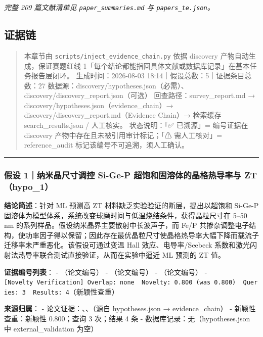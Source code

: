 \documentclass[12pt,a4paper]{ctexart}
\begin{document}
\emph{完整 209 篇文献清单见 \texttt{paper\_summaries.md} 与 \texttt{papers\_te.json}。}

\subsection{证据链}\label{ux8bc1ux636eux94fe}

\begin{quote}
本章节由 \texttt{scripts/inject\_evidence\_chain.py} 依据 discovery 产物自动生成，保证赛题红线 1「每个结论都能指回具体文献或数据库记录」在基本任务报告层闭环。 生成时间：2026-08-03 18:14｜假设总数：5｜证据条目总数：27 数据源：discovery/hypotheses.json（必需）、discovery/discovery\_report.json（可选） 回查路径：survey\_report.md → discovery/hypotheses.json（evidence\_chain）→ discovery/discovery\_report.md（Evidence Chain）→ 检索缓存 search\_results.json / 人工核实。 状态说明：「✅ 已溯源」= 编号证据在 discovery 产物中存在且未被引用审计标记；「⚠ 需人工核对」= reference\_audit 标记该编号不可追溯，须人工确认。
\end{quote}

\begin{center}\rule{0.5\linewidth}{0.5pt}\end{center}

\subsubsection{假设 1｜纳米晶尺寸调控 Si-Ge-P 超饱和固溶体的晶格热导率与 ZT（hypo\_1）}\label{ux5047ux8bbe-1ux7eb3ux7c73ux6676ux5c3aux5bf8ux8c03ux63a7-si-ge-p-ux8d85ux9971ux548cux56faux6eb6ux4f53ux7684ux6676ux683cux70edux5bfcux7387ux4e0e-zthypo_1}

\textbf{结论简述}：针对 ML 预测高 ZT 材料缺乏实验验证的断层，提出以超饱和 Si-Ge-P 固溶体为模型体系，系统改变球磨时间与低温烧结条件，获得晶粒尺寸在 5--50 nm 的系列样品。假设纳米晶界主要散射中长波声子，而 Fe/P 共掺杂调整电子结构，使功率因子得以保留；因此存在最优晶粒尺寸使晶格热导率大幅下降而载流子迁移率未严重恶化。该假设可通过变温 Hall 效应、电导率/Seebeck 系数和激光闪射法热导率联合测试直接验证，从而在实验中逼近 ML 预测的 ZT 值。

\textbf{证据编号列表}： - \texttt{\cite{TE002}}（论文编号） - \texttt{\cite{TE057}}（论文编号） - \texttt{\cite{TE009}}（论文编号） - \texttt{{[}Novelty\ Verification{]}\ Overlap:\ none\ \textbar{}\ Novelty:\ 0.800\ (was\ 0.800)\ \textbar{}\ Queries:\ 3\ \textbar{}\ Results:\ 4}（新颖性查重）

\textbf{来源归属}： - 论文证据：\texttt{\cite{TE002}}、\texttt{\cite{TE057}}、\texttt{\cite{TE009}}（源自 hypotheses.json → evidence\_chain） - 新颖性查重：新颖性 0.800；查询 3 次；结果 4 条 - 数据库记录：无（hypotheses.json 中 external\_validation 为空）
\end{document}
